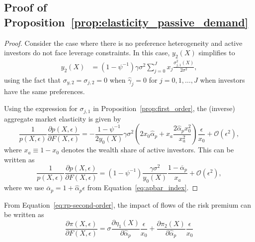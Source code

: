 \subsection{Proof of Proposition~\ref{prop:elasticity_passive_demand}}\label{app:prop_elasticity_passive_demand}
\begin{proof}
	Consider the case where there is no preference heterogeneity and active investors do not face leverage constraints. In this case, $y_2(X)$ simplifies to 
	\begin{align}
	y_2(X) &=  \left(1-\psi^{-1}\right) \gamma \sigma^2 \sum_{j=0}^J x_{j} \frac{\sigma_{j,1}^2(X)}{2 \sigma^2},
	\end{align}
	using the fact that $\sigma_{y,2} = \sigma_{j,2} = 0$ when $\hat{\gamma}_j = 0$ for $j = 0,1,\ldots,J$ when investors have the same preferences.
	
	Using the expression for $ \sigma_{j,1} $ in Proposition~\ref{prop:first_order}, the (inverse) aggregate market elasticity is given by 
	\begin{equation}
	\frac{1}{p(X,\epsilon)}\frac{\partial p(X,\epsilon)}{\partial F(X,\epsilon)} = - \frac{1-\psi^{-1}}{2 y_0(X)} \gamma \sigma^2 \left(2x_0 \hat{\alpha}_p  + x_{a}  \frac{2 \hat{\alpha}_p x_0^2}{x_{a}^2}\right)  \frac{\epsilon}{x_0} + \mathcal{O}(\epsilon^2), 
	\end{equation}
	where $ x_{a} \equiv 1-x_{0} $ denotes the wealth share of active investors.	This can be written as
	\begin{equation}
	\frac{1}{p(X,\epsilon)}\frac{\partial p(X,\epsilon)}{\partial F(X,\epsilon)} =  \left(1-\psi^{-1}\right)\frac{\gamma \sigma^2}{y_0(X)}  \frac{1-\overline{\alpha}_p}{x_{a}} + \mathcal{O}(\epsilon^2), 
	\end{equation}
	where we use $ \overline{\alpha}_p = 1+\hat{\alpha}_p \epsilon $ from Equation~\eqref{eq:apbar_index}. 
\end{proof}
From Equation~\eqref{eq:rp-second-order}, the impact of flows of the risk premium can be written as
\[\frac{\partial \pi(X,\epsilon)}{\partial F(X,\epsilon)}=\sigma\frac{\partial \eta_1(X)}{\partial\hat{\alpha}_p}\frac{\epsilon}{x_0}+
\frac{\partial \pi_2(X)}{\partial\hat{\alpha}_p}\frac{\epsilon}{x_0}\]

